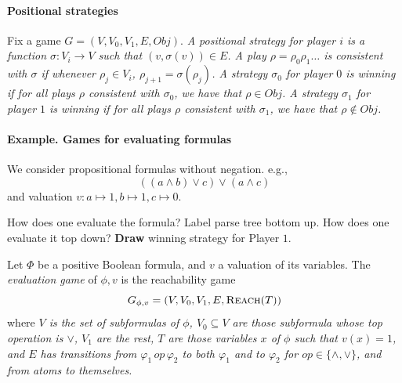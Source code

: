 \documentclass[a4paper,10pt]{article}
\newcommand{\po}{Player $1$\xspace}
\newcommand{\reach}[1]{\textsc{Reach}(#1)}
\newcommand{\obj}{Obj}
\begin{document}
 \paragraph{Positional strategies}
\begin{definition}
Fix a game $G = (V,V_0,V_1,E,\obj)$. 
\it
\- A \emph{positional strategy} for player $i$ is a 
function $\sigma:V_i \to V$ such that $(v,\sigma(v)) \in E$. 
\- A play $\rho = \rho_0 \rho_1 \dots$ is consistent with $\sigma$ if 
whenever $\rho_j \in V_i$, $\rho_{j+1} = \sigma(\rho_j)$.
\- A strategy $\sigma_0$ for player $0$ is \emph{winning} if for all plays $\rho$ consistent with 
$\sigma_0$, we have that $\rho \in \obj$. A strategy $\sigma_1$ for player $1$ is winning 
if for all plays $\rho$ consistent with $\sigma_1$, we have that $\rho \not \in \obj$.
\ti
\end{definition}


\paragraph{Example. Games for evaluating formulas}

\begin{example}
We consider propositional formulas without negation. e.g., 
\[ ((a \wedge b) \vee c) \vee (a \wedge c) \] and valuation $v:a \mapsto 1, b \mapsto 1, c \mapsto 0$.
\end{example}

\begin{question}
\en
\- How does one evaluate the formula? Label parse tree bottom up.
\- How does one evaluate it top down? \textbf{Draw} winning strategy for \po.
\ne
\end{question}
 




\begin{definition}
Let $\Phi$ be a positive Boolean formula, and $v$ a valuation of its variables.
 The \emph{evaluation game} of $\phi,v$ is the reachability game 
 \[ 
G_{\phi,v} = (V,V_0,V_1,E,\reach{T})  
 \]
where 
\it
\- $V$ is the set of subformulas of $\phi$, 
\- $V_0 \subseteq V$ are those subformula whose 
top operation is $\vee$, 
\- $V_1$ are the rest, 
\- $T$ are those variables $x$ of $\phi$ such that $v(x) = 1$, and 
\- $E$ has transitions from $\varphi_1 \,  op \, \varphi_2$ to both $\varphi_1$ and to 
$\varphi_2$ for $op \in \{\wedge,\vee\}$, and from atoms to themselves.
\ti
\end{definition}
\end{document}
